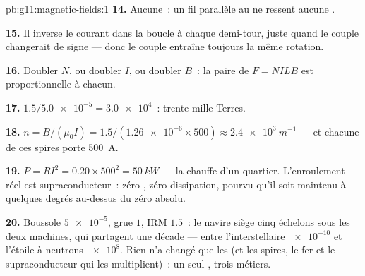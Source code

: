 \begin{solution}{pb:g11:magnetic-fields:1}
\textbf{14.} Aucune~: un fil parallèle au
 ne ressent aucune
.

\textbf{15.} Il inverse le courant dans la boucle à chaque demi-tour,
juste quand le couple changerait de signe --- donc le couple entraîne
toujours la même rotation.

\textbf{16.} Doubler $N$, ou doubler $I$, ou doubler $B$~: la paire de
 $F = NILB$ est proportionnelle à
chacun.

\textbf{17.} $1.5 / \num{5.0e-5} = \num{3.0e4}$~: trente mille Terres.

\textbf{18.} $n = B/(\mu_0 I) = 1.5 / (\num{1.26e-6} \times 500)
\approx \qty{2.4e3}{m^{-1}}$ --- et chacune de ces spires porte
\qty{500}{A}.

\textbf{19.} $P = RI^2 = 0.20 \times 500^2 = \qty{50}{kW}$ --- la
chauffe d'un quartier. L'enroulement réel est supraconducteur~: zéro
, zéro dissipation, pourvu qu'il
soit maintenu à quelques degrés au-dessus du zéro absolu.

\textbf{20.} Boussole $\num{5e-5}$, grue $1$, IRM $1.5$~: le navire
siège cinq échelons sous les deux machines, qui partagent une
décade --- entre l'interstellaire $\num{e-10}$ et l'étoile à neutrons
$\num{e8}$. Rien n'a changé que les
 (et les spires, le fer et le
supraconducteur qui les multiplient)~: un seul
, trois métiers.
\end{solution}
